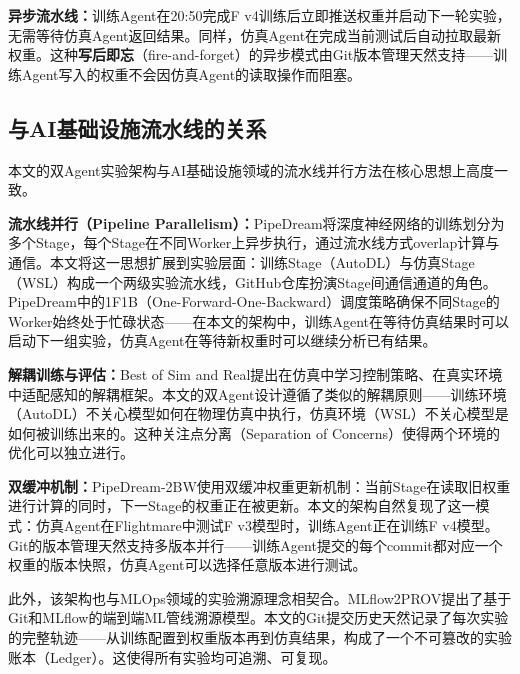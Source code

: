 \textbf{异步流水线：}训练Agent在20:50完成F v4训练后立即推送权重并启动下一轮实验，无需等待仿真Agent返回结果。同样，仿真Agent在完成当前测试后自动拉取最新权重。这种\textbf{写后即忘}（fire-and-forget）的异步模式由Git版本管理天然支持——训练Agent写入的权重不会因仿真Agent的读取操作而阻塞。

\subsection{与AI基础设施流水线的关系}

本文的双Agent实验架构与AI基础设施领域的流水线并行方法在核心思想上高度一致。

\textbf{流水线并行（Pipeline Parallelism）：}PipeDream\cite{narayanan2019pipedream}将深度神经网络的训练划分为多个Stage，每个Stage在不同Worker上异步执行，通过流水线方式overlap计算与通信。本文将这一思想扩展到实验层面：训练Stage（AutoDL）与仿真Stage（WSL）构成一个两级实验流水线，GitHub仓库扮演Stage间通信通道的角色。PipeDream中的1F1B（One-Forward-One-Backward）调度策略确保不同Stage的Worker始终处于忙碌状态——在本文的架构中，训练Agent在等待仿真结果时可以启动下一组实验，仿真Agent在等待新权重时可以继续分析已有结果。

\textbf{解耦训练与评估：}Best of Sim and Real\cite{bsr2025}提出在仿真中学习控制策略、在真实环境中适配感知的解耦框架。本文的双Agent设计遵循了类似的解耦原则——训练环境（AutoDL）不关心模型如何在物理仿真中执行，仿真环境（WSL）不关心模型是如何被训练出来的。这种关注点分离（Separation of Concerns）使得两个环境的优化可以独立进行。

\textbf{双缓冲机制：}PipeDream-2BW\cite{narayanan2021pipedream2bw}使用双缓冲权重更新机制：当前Stage在读取旧权重进行计算的同时，下一Stage的权重正在被更新。本文的架构自然复现了这一模式：仿真Agent在Flightmare中测试F v3模型时，训练Agent正在训练F v4模型。Git的版本管理天然支持多版本并行——训练Agent提交的每个commit都对应一个权重的版本快照，仿真Agent可以选择任意版本进行测试。

此外，该架构也与MLOps领域的实验溯源理念相契合。MLflow2PROV\cite{mlflow2prov2025}提出了基于Git和MLflow的端到端ML管线溯源模型。本文的Git提交历史天然记录了每次实验的完整轨迹——从训练配置到权重版本再到仿真结果，构成了一个不可篡改的实验账本（Ledger）。这使得所有实验均可追溯、可复现。
